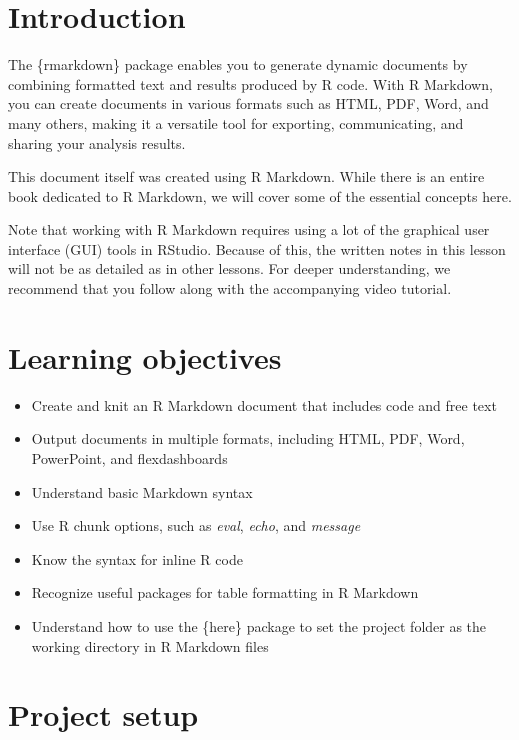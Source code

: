 \documentclass[
  letterpaper,
  DIV=11,
  numbers=noendperiod]{scrreprt}
\providecommand{\tightlist}{%
  \setlength{\itemsep}{0pt}\setlength{\parskip}{0pt}}\usepackage{longtable,booktabs,array}
\begin{document}
\section{Introduction}\label{introduction-6}

The \{rmarkdown\} package enables you to generate dynamic documents by
combining formatted text and results produced by R code. With R
Markdown, you can create documents in various formats such as HTML, PDF,
Word, and many others, making it a versatile tool for exporting,
communicating, and sharing your analysis results.

This document itself was created using R Markdown. While there is an
entire book dedicated to R Markdown, we will cover some of the essential
concepts here.

Note that working with R Markdown requires using a lot of the graphical
user interface (GUI) tools in RStudio. Because of this, the written
notes in this lesson will not be as detailed as in other lessons. For
deeper understanding, we recommend that you follow along with the
accompanying video tutorial.

\section*{Learning objectives}\label{learning-objectives-4}


\begin{itemize}
\tightlist
\item
  Create and knit an R Markdown document that includes code and free
  text
\item
  Output documents in multiple formats, including HTML, PDF, Word,
  PowerPoint, and flexdashboards
\item
  Understand basic Markdown syntax
\item
  Use R chunk options, such as \emph{eval}, \emph{echo}, and
  \emph{message}
\item
  Know the syntax for inline R code
\item
  Recognize useful packages for table formatting in R Markdown
\item
  Understand how to use the \{here\} package to set the project folder
  as the working directory in R Markdown files
\end{itemize}

\section{Project setup}\label{project-setup}
\end{document}
